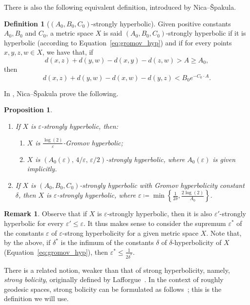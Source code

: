 \documentclass[12pt]{amsart}
\numberwithin{equation}{section}
\numberwithin{figure}{section}
\newtheorem{proposition}[equation]{Proposition}
\theoremstyle{definition}
\newtheorem{remark}[equation]{Remark}
\newtheorem{definition}[equation]{Definition}
\theoremstyle{plain}
\renewcommand{\epsilon}{\varepsilon}
\begin{document}
There is also the following equivalent definition, introduced by Nica--\v{S}pakula.

\begin{definition}[$(A_0,B_0,C_0)$-strongly hyperbolic]
Given positive constants $A_0,B_0$ and $C_0$, a metric space $X$ is said $(A_0,B_0,C_0)$-strongly hyperbolic if it is hyperbolic (according to Equation~\ref{eq:gromov_hyp}) and if for every points $x,y,z,w \in X$, we have that, if
\[
d(x,z) + d(y,w)-d(x,y)-d(z,w) > A \geq A_0,
\]
then
\[
d(x,z) + d(y,w)-d(x,w)-d(y,z) < B_0 e^{-C_0 \cdot A}.
\]
\end{definition}

In \cite[Lemma~6.2]{BS16:StrongHyp}, Nica--\v{S}pakula prove the following.

\begin{proposition}
\label{prop:nica_spakula}
\begin{enumerate}
    \item If $X$ is $\epsilon$-strongly hyperbolic, then:
    \begin{enumerate}
        \item $X$ is $\frac{\log(2)}{\epsilon}$-Gromov hyperbolic;
        \item $X$ is $(A_0(\epsilon),\, 4/\epsilon,\, \epsilon/2)$-strongly hyperbolic,
        where $A_0(\epsilon)$ is given implicitly.
    \end{enumerate}

    \item If $X$ is $(A_0,B_0,C_0)$-strongly hyperbolic with Gromov hyperbolicity constant $\delta$, then $X$ is $\epsilon$-strongly hyperbolic, where
    $\epsilon \coloneqq \min\left\{
        \frac{1}{2\delta},
        \frac{2\log(2)}{A_0}
    \right\}.$
\end{enumerate}
\end{proposition}

\begin{remark}
Observe that if $X$ is $\epsilon$-strongly hyperbolic, then it is also $\epsilon'$-strongly hyperbolic for every $\epsilon' \leq \epsilon$.
It thus makes sense to consider the supremum $\epsilon^*$ of the constants $\epsilon$ of $\epsilon$-strong hyperbolicity for a given metric space $X$. Note that, by the above, if $\delta^*$ is the infimum of the constants $\delta$ of $\delta$-hyperbolicity of $X$ (Equation~\ref{eq:gromov_hyp}), then
$\epsilon^* \leq \frac{1}{2\delta^*}$. 
\end{remark}

There is a related notion, weaker than that of strong hyperbolicity, namely, \emph{strong bolicity}, originally defined by Lafforgue~\cite{Lafforgue2002}. In the context of roughly geodesic spaces, strong bolicity can be formulated as follows~\cite[p.~960]{NicaSpakula2016}; this is the definition we will use.
\end{document}

